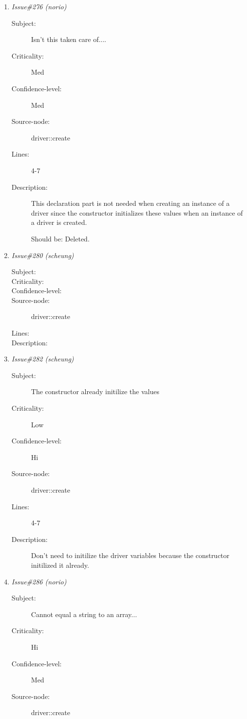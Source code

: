 \begin{enumerate}
\begin{description}
\item [Lines:] 7

\item [Description:] This could be a programmer logic error, such that the
 drivers years of experience initially is set at a
 negative value.

 Should be: years\_exp = 0;
\end{description}
\item {\it Issue\#276 (norio)}
\begin{description}
\item [Subject:] Isn't this taken care of....
\item [Criticality:] Med
\item [Confidence-level:] Med
\item [Source-node:] driver::create

\item [Lines:] 4-7

\item [Description:] This declaration part is not needed when creating an
 instance of a driver since the constructor initializes
 these values when an instance of a driver is created.

 Should be: Deleted.
\end{description}
\item {\it Issue\#280 (scheung)}
\begin{description}
\item [Subject:] 
\item [Criticality:] 
\item [Confidence-level:] 
\item [Source-node:] driver::create

\item [Lines:] 

\item [Description:] 
\end{description}
\item {\it Issue\#282 (scheung)}
\begin{description}
\item [Subject:] The constructor already initilize the values
\item [Criticality:] Low
\item [Confidence-level:] Hi
\item [Source-node:] driver::create

\item [Lines:] 4-7

\item [Description:] Don't need to initilize the driver variables
because the constructor initilized it already.
\end{description}
\item {\it Issue\#286 (norio)}
\begin{description}
\item [Subject:] Cannot equal a string to an array...
\item [Criticality:] Hi
\item [Confidence-level:] Med
\item [Source-node:] driver::create


\end{description}
\end{enumerate}
